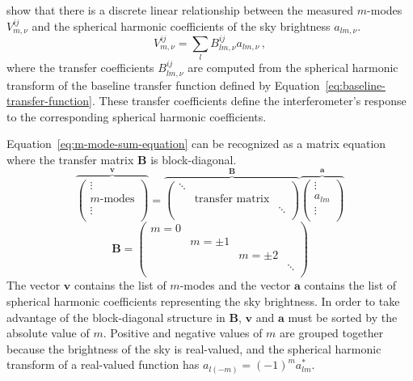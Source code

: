 \documentclass[twocolumn]{aastex61}
\renewcommand{\b}{\pmb}
\begin{document}
\citet{2014ApJ...781...57S, 2015PhRvD..91h3514S} show that there is a discrete linear relationship
between the measured $m$-modes $V^{ij}_{m,\nu}$ and the spherical harmonic coefficients of the sky
brightness $a_{lm,\nu}$.
\begin{equation}\label{eq:m-mode-sum-equation}
    V^{ij}_{m,\nu} = \sum_l B^{ij}_{lm,\nu} a_{lm,\nu}\,,
\end{equation}
where the transfer coefficients $B^{ij}_{lm,\nu}$ are computed from the spherical harmonic transform
of the baseline transfer function defined by Equation~\ref{eq:baseline-transfer-function}. These
transfer coefficients define the interferometer's response to the corresponding spherical harmonic
coefficients.

Equation~\ref{eq:m-mode-sum-equation} can be recognized as a matrix equation where the transfer
matrix $\b B$ is block-diagonal.
\begin{equation}\label{eq:m-mode-matrix-equation}
    \overbrace{\left(
        \begin{array}{c}
            \vdots \\
            m\text{-modes} \\
            \vdots \\
        \end{array}
    \right)}^{\b v}
    =
    \overbrace{\left(
        \begin{array}{ccc}
            \ddots & & \\
            & \text{transfer matrix} & \\
            & & \ddots \\
        \end{array}
    \right)}^{\b B}
    \overbrace{\left(
        \begin{array}{c}
            \vdots \\
            a_{lm} \\
            \vdots \\
        \end{array}
    \right)}^{\b a}
\end{equation}
\begin{equation}
    \b B = \left(\begin{array}{cccc}
        m = 0 &&& \\
              & m=\pm1 && \\
              && m=\pm2 & \\
              &&& \ddots \\
    \end{array}\right)
\end{equation}
The vector $\b v$ contains the list of $m$-modes and the vector $\b a$ contains the list of
spherical harmonic coefficients representing the sky brightness. In order to take advantage of the
block-diagonal structure in $\b B$, $\b v$ and $\b a$ must be sorted by the absolute value of $m$.
Positive and negative values of $m$ are grouped together because the brightness of the sky is
real-valued, and the spherical harmonic transform of a real-valued function has $a_{l(-m)} = (-1)^m
a_{lm}^*$.
\end{document}
